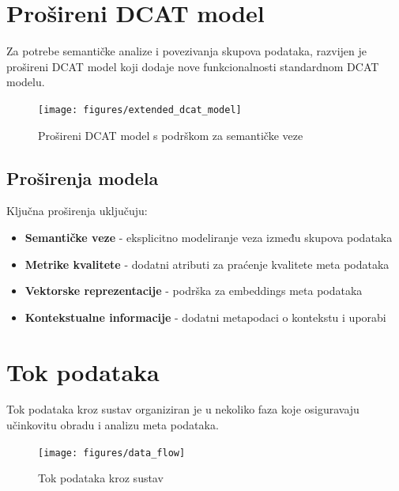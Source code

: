 \section{Prošireni DCAT model}
\label{sec:extended_dcat}

Za potrebe semantičke analize i povezivanja skupova podataka, razvijen je prošireni 
DCAT model koji dodaje nove funkcionalnosti standardnom DCAT modelu.

\begin{figure}[h]
    \centering
    \texttt{[image: figures/extended\_dcat\_model]}
    \caption{Prošireni DCAT model s podrškom za semantičke veze}
    \label{fig:extended_dcat_model}
\end{figure}

\subsection{Proširenja modela}
Ključna proširenja uključuju:

\begin{itemize}
    \item \textbf{Semantičke veze} - eksplicitno modeliranje veza između skupova podataka
    \item \textbf{Metrike kvalitete} - dodatni atributi za praćenje kvalitete meta podataka
    \item \textbf{Vektorske reprezentacije} - podrška za embeddings meta podataka
    \item \textbf{Kontekstualne informacije} - dodatni metapodaci o kontekstu i uporabi
\end{itemize}

\section{Tok podataka}
\label{sec:data_flow}

Tok podataka kroz sustav organiziran je u nekoliko faza koje osiguravaju učinkovitu 
obradu i analizu meta podataka.

\begin{figure}[h]
    \centering
    \texttt{[image: figures/data\_flow]}
    \caption{Tok podataka kroz sustav}
    \label{fig:data_flow}
\end{figure}

